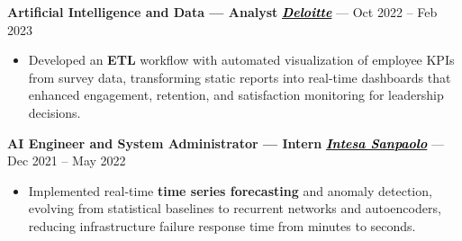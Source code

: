 \documentclass[11pt,a4paper]{article}
\let\OldHref\href
\renewcommand{\href}[2]{\OldHref{#1}{\textit{#2}}}
\begin{document}
{		\textbf{Artificial Intelligence and Data — Analyst} \hfill \href{https://www2.deloitte.com/}{\textbf{\textcolor{black}{Deloitte}}} — Oct 2022 -- Feb 2023
		\begin{itemize}
			\item Developed an \textbf{ETL} workflow with automated visualization of employee KPIs from survey data, transforming static reports into real-time dashboards that enhanced engagement, retention, and satisfaction monitoring for leadership decisions.
		\end{itemize}
		
		\textbf{AI Engineer and System Administrator — Intern} \hfill \href{https://www.intesasanpaolo.com/}{\textbf{\textcolor{black}{Intesa Sanpaolo}}} — Dec 2021 -- May 2022
		\begin{itemize}
			\item Implemented real-time \textbf{time series forecasting} and anomaly detection, evolving from statistical baselines to recurrent networks and autoencoders, reducing infrastructure failure response time from minutes to seconds.
		\end{itemize}
	}
	
\end{document}
